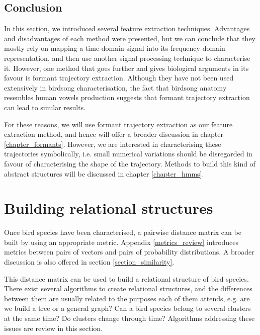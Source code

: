 \documentclass[../main.tex]{subfiles} \label{chapter_soa}
\begin{document}
\subsection{Conclusion}
In this section, we introduced several feature extraction techniques. Advantages and disadvantages of each method were presented, but we can conclude that they mostly rely on mapping a time-domain signal into its frequency-domain representation, and then use another signal processing technique to characterise it. However, one method that goes further and gives biological arguments in its favour is formant trajectory extraction. Although they have not been used extensively in birdsong characterisation, the fact that birdsong anatomy resembles human vowels production suggests that formant trajectory extraction can lead to similar results.
\par For these reasons, we will use formant trajectory extraction as our feature extraction method, and hence will offer a broader discussion in chapter \ref{chapter_formants}. However, we are interested in characterising these trajectories symbolically, i.e. small numerical variations should be disregarded in favour of characterising the shape of the trajectory. Methods to build this kind of abstract structures will be discussed in chapter \ref{chapter_hmms}.


\section{Building relational structures}\label{algorithms_review}
Once bird species have been characterised, a pairwise distance matrix can be built by using an appropriate metric. Appendix \ref{metrics_review} introduces metrics between pairs of vectors and pairs of probability distributions. A broader discussion is also offered in section \ref{section_similarity}.
\par This distance matrix can be used to build a relational structure of bird species. There exist several algorithms to create relational structures, and the differences between them are usually related to the purposes each of them attends, e.g. are we build a tree or a general graph? Can a bird species belong to several clusters at the same time? Do clusters change through time? Algorithms addressing these issues are review in this section.
\end{document}
